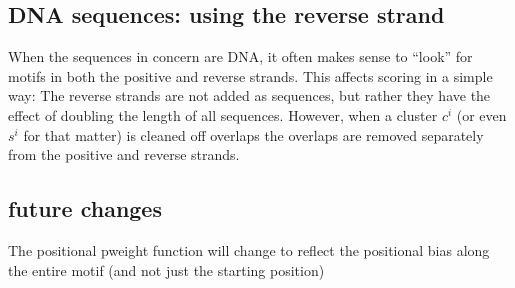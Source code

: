 \documentclass{amsart}
\theoremstyle{definition}
\theoremstyle{remark}
\theoremstyle{definition}
\theoremstyle{remark}
\begin{document}
\subsection{DNA sequences: using the reverse strand}
When the sequences in concern are DNA, it often makes sense to ``look'' for motifs
in both the positive and reverse strands. This affects scoring in a simple way:
The reverse strands are not added as sequences, 
but rather they have the effect of doubling the length of all sequences.
However, when a cluster $c^i$ (or even $s^i$ for that matter) is cleaned off overlaps
the overlaps are removed separately from the positive and reverse strands.

\subsection{future changes}
The positional pweight function will change to reflect the positional bias
along the entire motif (and not just the starting position)
\end{document}
